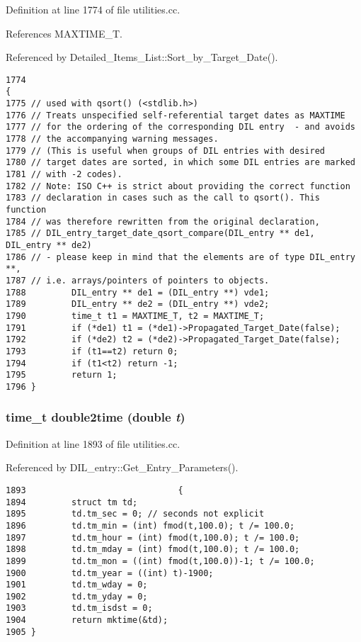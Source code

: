 Definition at line 1774 of file utilities.cc.

References MAXTIME\_\-T.

Referenced by Detailed\_\-Items\_\-List::Sort\_\-by\_\-Target\_\-Date().



\footnotesize\begin{verbatim}1774                                                                               {
1775 // used with qsort() (<stdlib.h>)
1776 // Treats unspecified self-referential target dates as MAXTIME
1777 // for the ordering of the corresponding DIL entry  - and avoids
1778 // the accompanying warning messages.
1779 // (This is useful when groups of DIL entries with desired
1780 // target dates are sorted, in which some DIL entries are marked
1781 // with -2 codes).
1782 // Note: ISO C++ is strict about providing the correct function
1783 // declaration in cases such as the call to qsort(). This function
1784 // was therefore rewritten from the original declaration,
1785 // DIL_entry_target_date_qsort_compare(DIL_entry ** de1, DIL_entry ** de2)
1786 // - please keep in mind that the elements are of type DIL_entry **,
1787 // i.e. arrays/pointers of pointers to objects.
1788         DIL_entry ** de1 = (DIL_entry **) vde1;
1789         DIL_entry ** de2 = (DIL_entry **) vde2;
1790         time_t t1 = MAXTIME_T, t2 = MAXTIME_T;
1791         if (*de1) t1 = (*de1)->Propagated_Target_Date(false);
1792         if (*de2) t2 = (*de2)->Propagated_Target_Date(false);
1793         if (t1==t2) return 0;
1794         if (t1<t2) return -1;
1795         return 1;
1796 }
\end{verbatim}\normalsize 
{}
\subsubsection{\setlength{\rightskip}{0pt plus 5cm}time\_\-t double2time (double {\em t})}\label{utilities_8cc_a27}




Definition at line 1893 of file utilities.cc.

Referenced by DIL\_\-entry::Get\_\-Entry\_\-Parameters().



\footnotesize\begin{verbatim}1893                              {
1894         struct tm td;
1895         td.tm_sec = 0; // seconds not explicit
1896         td.tm_min = (int) fmod(t,100.0); t /= 100.0;
1897         td.tm_hour = (int) fmod(t,100.0); t /= 100.0;
1898         td.tm_mday = (int) fmod(t,100.0); t /= 100.0;
1899         td.tm_mon = ((int) fmod(t,100.0))-1; t /= 100.0;
1900         td.tm_year = ((int) t)-1900;
1901         td.tm_wday = 0;
1902         td.tm_yday = 0;
1903         td.tm_isdst = 0;
1904         return mktime(&td);
1905 }
\end{verbatim}\normalsize 
{}
